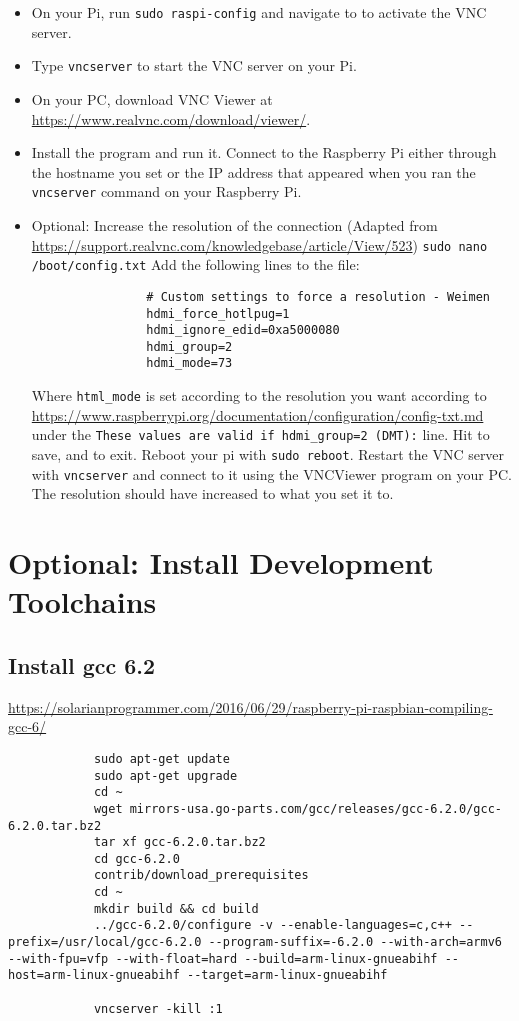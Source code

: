 \documentclass{article}
\begin{document}
		\begin{itemize}
			\item On your Pi, run \verb|sudo raspi-config| and navigate to  to activate the VNC server.
			\item Type \verb|vncserver| to start the VNC server on your Pi. 
			\item On your PC, download VNC Viewer at \url{https://www.realvnc.com/download/viewer/}.
			\item Install the program and run it. Connect to the Raspberry Pi either through the hostname you set or the IP address that appeared when you ran the \verb|vncserver| command on your Raspberry Pi.
			\item Optional: Increase the resolution of the connection (Adapted from \url{https://support.realvnc.com/knowledgebase/article/View/523})
			\subitem \verb|sudo nano /boot/config.txt|
			\subitem Add the following lines to the file:
			\begin{verbatim}
				# Custom settings to force a resolution - Weimen
				hdmi_force_hotlpug=1
				hdmi_ignore_edid=0xa5000080
				hdmi_group=2
				hdmi_mode=73
			\end{verbatim}
			Where \verb|html_mode| is set according to the resolution you want according to \url{https://www.raspberrypi.org/documentation/configuration/config-txt.md} under the \verb|These values are valid if hdmi_group=2 (DMT):| line.
			\subitem Hit  to save, and  to exit.
			\subitem Reboot your pi with \verb|sudo reboot|.
			\subitem Restart the VNC server with \verb|vncserver| and connect to it using the VNCViewer program on your PC. The resolution should have increased to what you set it to.
			
			
		\end{itemize}
		
		\section{Optional: Install Development Toolchains}
		\subsection{Install gcc 6.2}
		\url{https://solarianprogrammer.com/2016/06/29/raspberry-pi-raspbian-compiling-gcc-6/}
		\begin{verbatim}
			sudo apt-get update
			sudo apt-get upgrade
			cd ~
			wget mirrors-usa.go-parts.com/gcc/releases/gcc-6.2.0/gcc-6.2.0.tar.bz2
			tar xf gcc-6.2.0.tar.bz2
			cd gcc-6.2.0
			contrib/download_prerequisites
			cd ~
			mkdir build && cd build
			../gcc-6.2.0/configure -v --enable-languages=c,c++ --prefix=/usr/local/gcc-6.2.0 --program-suffix=-6.2.0 --with-arch=armv6 --with-fpu=vfp --with-float=hard --build=arm-linux-gnueabihf --host=arm-linux-gnueabihf --target=arm-linux-gnueabihf
			
			vncserver -kill :1
			
			
		\end{verbatim}
		
\end{document}
